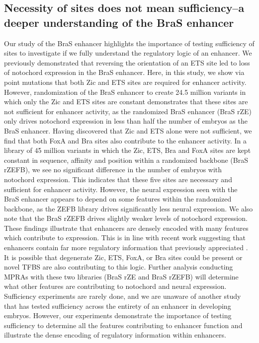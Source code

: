 \subsection{Necessity of sites does not mean sufficiency--a deeper understanding of the BraS enhancer}

Our study of the BraS enhancer highlights the importance of testing sufficiency of sites to investigate if we fully understand the regulatory logic of an enhancer. We previously demonstrated that reversing the orientation of an ETS site led to loss of notochord expression in the BraS enhancer. Here, in this study, we show via point mutations that both Zic and ETS sites are required for enhancer activity. However, randomization of the BraS enhancer to create 24.5 million variants in which only the Zic and ETS sites are constant demonstrates that these sites are not sufficient for enhancer activity, as the randomized BraS enhancer (BraS rZE) only drives notochord expression in less than half the number of embryos as the BraS enhancer. Having discovered that Zic and ETS alone were not sufficient, we find that both FoxA and Bra sites also contribute to the enhancer activity. In a library of 45 million variants in which the Zic, ETS, Bra and FoxA sites are kept constant in sequence, affinity and position within a randomized backbone (BraS rZEFB), we see no significant difference in the number of embryos with notochord expression. This indicates that these five sites are necessary and sufficient for enhancer activity. However, the neural expression seen with the BraS enhancer appears to depend on some features within the randomized backbone, as the ZEFB library drives significantly less neural expression. We also note that the BraS rZEFB drives slightly weaker levels of notochord expression. These findings illustrate that enhancers are densely encoded with many features which contribute to expression. This is in line with recent work suggesting that enhancers contain far more regulatory information that previously appreciated \cite{fuqua2020}. It is possible that degenerate Zic, ETS, FoxA, or Bra sites could be present or novel TFBS are also contributing to this logic. Further analysis conducting MPRAs with these two libraries (BraS rZE and BraS rZEFB) will determine what other features are contributing to  notochord and neural expression. Sufficiency experiments are rarely done, and we are unaware of another study that has tested sufficiency across the entirety of an enhancer in developing embryos. However, our experiments demonstrate the importance of testing sufficiency to determine all the features contributing to enhancer function and illustrate the dense encoding of regulatory information within enhancers. 

